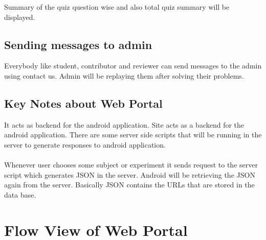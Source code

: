 \documentclass[12pt]{report}
\begin{document}
Summary of the quiz question wise and also total quiz summary will be displayed.

\subsection{Sending messages to admin}

Everybody like student, contributor and reviewer can send messages to the admin using contact us.
Admin will be replaying them after solving their problems. 

\subsection{Key Notes about Web Portal}

It acts as backend for the android application. Site acts as a backend for the android application. 
There are some server side scripts that will be running in the server to generate responses to android application.\\ \\ Whenever user chooses some subject or experiment it sends request to the server script which generates JSON in the server. Android will be retrieving the JSON again from the server. Basically JSON contains the URLs that are stored in the data base.
\pagebreak

\section{Flow View of Web Portal}
\end{document}
